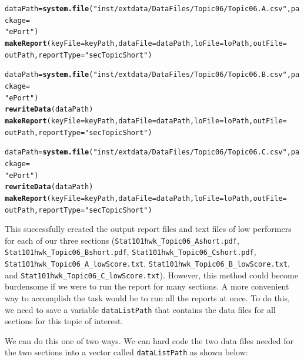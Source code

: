\documentclass{article}\usepackage[]{graphicx}\usepackage[]{color}
\makeatletter
\newcommand{\hlstr}[1]{\textcolor[rgb]{0.192,0.494,0.8}{#1}}%
\newcommand{\hlstd}[1]{\textcolor[rgb]{0.345,0.345,0.345}{#1}}%
\newcommand{\hlkwb}[1]{\textcolor[rgb]{0.69,0.353,0.396}{#1}}%
\newcommand{\hlkwc}[1]{\textcolor[rgb]{0.333,0.667,0.333}{#1}}%
\newcommand{\hlkwd}[1]{\textcolor[rgb]{0.737,0.353,0.396}{\textbf{#1}}}%
\newenvironment{kframe}{%
 \def\at@end@of@kframe{}%
 \ifinner\ifhmode%
  \def\at@end@of@kframe{\end{minipage}}%
  \begin{minipage}{\columnwidth}%
 \fi\fi%
 \def\FrameCommand##1{\hskip\@totalleftmargin \hskip-\fboxsep
 \colorbox{shadecolor}{##1}\hskip-\fboxsep
     \hskip-\linewidth \hskip-\@totalleftmargin \hskip\columnwidth}%
 \MakeFramed {\advance\hsize-\width
   \@totalleftmargin\z@ \linewidth\hsize
   \@setminipage}}%
 {\par\unskip\endMakeFramed%
 \at@end@of@kframe}
\newenvironment{knitrout}{}{} %
\numberwithin{equation}{section} %
\makeatother
\begin{document}
\begin{knitrout}
\color{fgcolor}\begin{kframe}
\begin{alltt}
\hlstd{dataPath} \hlkwb{=} \hlkwd{system.file}\hlstd{(}\hlstr{"inst/extdata/DataFiles/Topic06/Topic06.A.csv"}\hlstd{,} \hlkwc{package} \hlstd{=}
  \hlstr{"ePort"}\hlstd{)}
\hlkwd{makeReport}\hlstd{(}\hlkwc{keyFile} \hlstd{= keyPath,} \hlkwc{dataFile} \hlstd{= dataPath,} \hlkwc{loFile} \hlstd{= loPath,} \hlkwc{outFile} \hlstd{=}
  \hlstd{outPath,} \hlkwc{reportType} \hlstd{=} \hlstr{"secTopicShort"}\hlstd{)}

\hlstd{dataPath} \hlkwb{=} \hlkwd{system.file}\hlstd{(}\hlstr{"inst/extdata/DataFiles/Topic06/Topic06.B.csv"}\hlstd{,} \hlkwc{package} \hlstd{=}
  \hlstr{"ePort"}\hlstd{)}
\hlkwd{rewriteData}\hlstd{(dataPath)}
\hlkwd{makeReport}\hlstd{(}\hlkwc{keyFile} \hlstd{= keyPath,} \hlkwc{dataFile} \hlstd{= dataPath,} \hlkwc{loFile} \hlstd{= loPath,} \hlkwc{outFile} \hlstd{=}
  \hlstd{outPath,} \hlkwc{reportType} \hlstd{=} \hlstr{"secTopicShort"}\hlstd{)}

\hlstd{dataPath} \hlkwb{=} \hlkwd{system.file}\hlstd{(}\hlstr{"inst/extdata/DataFiles/Topic06/Topic06.C.csv"}\hlstd{,} \hlkwc{package} \hlstd{=}
  \hlstr{"ePort"}\hlstd{)}
\hlkwd{rewriteData}\hlstd{(dataPath)}
\hlkwd{makeReport}\hlstd{(}\hlkwc{keyFile} \hlstd{= keyPath,} \hlkwc{dataFile} \hlstd{= dataPath,} \hlkwc{loFile} \hlstd{= loPath,} \hlkwc{outFile} \hlstd{=}
  \hlstd{outPath,} \hlkwc{reportType} \hlstd{=} \hlstr{"secTopicShort"}\hlstd{)}
\end{alltt}
\end{kframe}
\end{knitrout}

This successfully created the output report files and text files of low performers for each of our three sections (\texttt{Stat101hwk\_Topic06\_A\-short.pdf}, \texttt{Stat101hwk\_Topic06\_B\-short.pdf}, \texttt{Stat101hwk\_Topic06\_C\-short.pdf}, \texttt{Stat101hwk\_Topic06\_A\_lowScore.txt}, \texttt{Stat101hwk\_Topic06\_B\_lowScore.txt}, and \texttt{Stat101hwk\_Topic06\_C\_lowScore.txt}). However, this method could become burdensome if we were to run the report for many sections. A more convenient way to accomplish the task would be to run all the reports at once. To do this, we need to save a variable \texttt{dataListPath} that contains the data files for all sections for this topic of interest.

We can do this one of two ways. We can hard code the two data files needed for the two sections into a vector called \texttt{dataListPath} as shown below:
\end{document}
